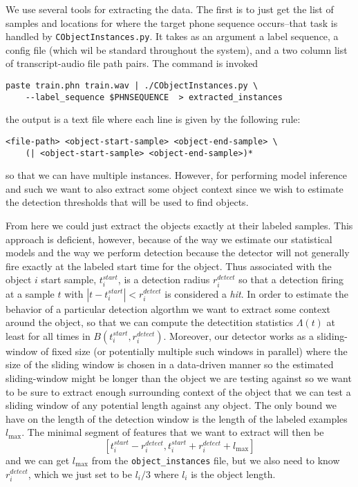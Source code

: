 \documentclass{article}
\begin{document}
We use several tools for extracting the data. The first is to just get the list of samples and locations for where the 
target phone sequence occurs--that task is handled by \texttt{CObjectInstances.py}. It takes as an argument a label sequence, a config file
(which wil be standard throughout the system), and a two column list of transcript-audio file path pairs. The command is invoked
\begin{verbatim}
paste train.phn train.wav | ./CObjectInstances.py \
    --label_sequence $PHNSEQUENCE  > extracted_instances
\end{verbatim}
the output is a text file where each line is given by the following rule:
\begin{verbatim}
<file-path> <object-start-sample> <object-end-sample> \
    (| <object-start-sample> <object-end-sample>)*
\end{verbatim}
so that we can have multiple instances.  However, for performing model inference and such we want to also extract some object context
since we wish to estimate the detection thresholds that will be used to find objects.

From here we could just extract the objects exactly at
their labeled samples.  This approach is deficient, however,
because of the way we estimate our statistical models and the
way we perform detection because the detector will not generally
fire exactly at the labeled start time for the object.  Thus
associated with the object $i$ start sample, $t_i^{start}$, is a detection
radius $r_i^{detect}$ so that a detection firing at a sample
$t$ with $|t-t_i^{start}|<r_i^{detect}$ is considered a \textit{hit}.
In order to estimate the behavior of a particular detection
algorthm
we want to extract some context around the object, so that
we can compute the detectition statistics $\Lambda(t)$ at least
for all times in $B(t_i^{start},r_i^{detect})$.  Moreover,
our detector works as a sliding-window of fixed size
(or potentially multiple such windows in parallel) where the size
of the sliding window is chosen in a data-driven manner so the
estimated sliding-window might be longer than the object we are
testing against so we want to be sure to extract enough surrounding
context of the object that we can test a sliding window of any
potential length against any object.  The only bound we have
on the length of the detection window is the length of the
labeled examples $l_{\max}$.  The minimal segment of features
that we want to extract will then be
$$[t_i^{start}-r_i^{detect},t_i^{start}+r_i^{detect}+l_{\max}]$$
and we can get $l_{\max}$ from the \texttt{object\_instances} file,
but we also need to know $r_i^{detect}$, which we just set to be
$l_i/3$ where $l_i$ is the object length.
\end{document}
